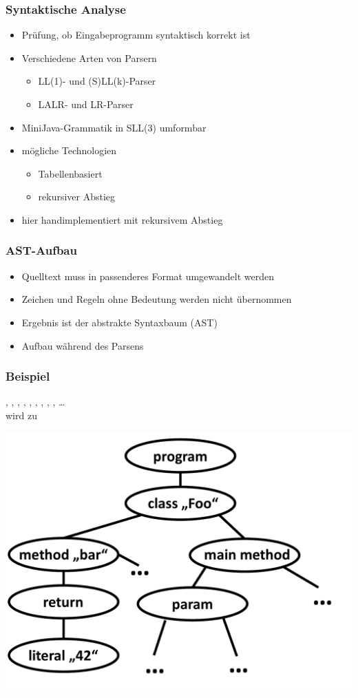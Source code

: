 \begin{frame}
    \frametitle{Syntaktische Analyse}
    \begin{itemize}
    \item Prüfung, ob Eingabeprogramm syntaktisch korrekt ist
    \item Verschiedene Arten von Parsern
    	\begin{itemize}
    	\item LL(1)- und (S)LL(k)-Parser
    	\item LALR- und LR-Parser
    	\end{itemize}
    \item MiniJava-Grammatik in SLL(3) umformbar \pause
    \item mögliche Technologien
	    \begin{itemize}
		\item Tabellenbasiert
		\item rekursiver Abstieg
    	\end{itemize}
    \item hier handimplementiert mit rekursivem Abstieg
    \end{itemize}
\end{frame}

\begin{frame}
	\frametitle{AST-Aufbau}
	\begin{itemize}
	\item Quelltext muss in passenderes Format umgewandelt werden
	\item Zeichen und Regeln ohne Bedeutung werden nicht übernommen
	\item Ergebnis ist der abstrakte Syntaxbaum (AST)
	\item Aufbau während des Parsens
	\end{itemize}
\end{frame}

\begin{frame}
	\frametitle{Beispiel}
	, , \token{\{}, , , , \token{(}, \token{)}, \token{\{}, \ldots \\
        wird zu \\
     \begin{center}
     \includegraphics[scale=0.3]{images/AST.pdf}
     \end{center}
\end{frame}
